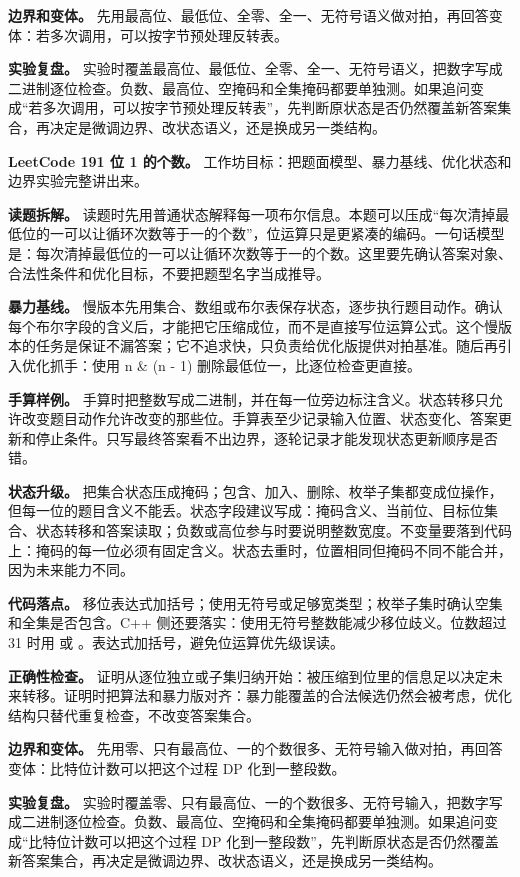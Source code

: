 \textbf{边界和变体。} 先用最高位、最低位、全零、全一、无符号语义做对拍，再回答变体：若多次调用，可以按字节预处理反转表。

\textbf{实验复盘。} 实验时覆盖最高位、最低位、全零、全一、无符号语义，把数字写成二进制逐位检查。负数、最高位、空掩码和全集掩码都要单独测。如果追问变成“若多次调用，可以按字节预处理反转表”，先判断原状态是否仍然覆盖新答案集合，再决定是微调边界、改状态语义，还是换成另一类结构。

\noindent\textbf{LeetCode 191 位 1 的个数。} 工作坊目标：把题面模型、暴力基线、优化状态和边界实验完整讲出来。

\textbf{读题拆解。} 读题时先用普通状态解释每一项布尔信息。本题可以压成“每次清掉最低位的一可以让循环次数等于一的个数”，位运算只是更紧凑的编码。一句话模型是：每次清掉最低位的一可以让循环次数等于一的个数。这里要先确认答案对象、合法性条件和优化目标，不要把题型名字当成推导。

\textbf{暴力基线。} 慢版本先用集合、数组或布尔表保存状态，逐步执行题目动作。确认每个布尔字段的含义后，才能把它压缩成位，而不是直接写位运算公式。这个慢版本的任务是保证不漏答案；它不追求快，只负责给优化版提供对拍基准。随后再引入优化抓手：使用 n \& (n - 1) 删除最低位一，比逐位检查更直接。

\textbf{手算样例。} 手算时把整数写成二进制，并在每一位旁边标注含义。状态转移只允许改变题目动作允许改变的那些位。手算表至少记录输入位置、状态变化、答案更新和停止条件。只写最终答案看不出边界，逐轮记录才能发现状态更新顺序是否错。

\textbf{状态升级。} 把集合状态压成掩码；包含、加入、删除、枚举子集都变成位操作，但每一位的题目含义不能丢。状态字段建议写成：掩码含义、当前位、目标位集合、状态转移和答案读取；负数或高位参与时要说明整数宽度。不变量要落到代码上：掩码的每一位必须有固定含义。状态去重时，位置相同但掩码不同不能合并，因为未来能力不同。

\textbf{代码落点。} 移位表达式加括号；使用无符号或足够宽类型；枚举子集时确认空集和全集是否包含。C++ 侧还要落实：使用无符号整数能减少移位歧义。位数超过 31 时用  或 。表达式加括号，避免位运算优先级误读。

\textbf{正确性检查。} 证明从逐位独立或子集归纳开始：被压缩到位里的信息足以决定未来转移。证明时把算法和暴力版对齐：暴力能覆盖的合法候选仍然会被考虑，优化结构只替代重复检查，不改变答案集合。

\textbf{边界和变体。} 先用零、只有最高位、一的个数很多、无符号输入做对拍，再回答变体：比特位计数可以把这个过程 DP 化到一整段数。

\textbf{实验复盘。} 实验时覆盖零、只有最高位、一的个数很多、无符号输入，把数字写成二进制逐位检查。负数、最高位、空掩码和全集掩码都要单独测。如果追问变成“比特位计数可以把这个过程 DP 化到一整段数”，先判断原状态是否仍然覆盖新答案集合，再决定是微调边界、改状态语义，还是换成另一类结构。

